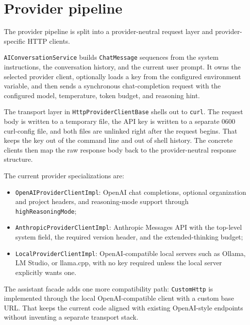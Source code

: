 \section{Provider pipeline}
\label{sec:ai-pipeline}

The provider pipeline is split into a provider-neutral request layer and provider-specific HTTP clients.

\texttt{AIConversationService} builds \texttt{ChatMessage} sequences from the system instructions, the conversation history, and the current user prompt. It owns the selected provider client, optionally loads a key from the configured environment variable, and then sends a synchronous chat-completion request with the configured model, temperature, token budget, and reasoning hint.

The transport layer in \texttt{HttpProviderClientBase} shells out to \texttt{curl}. The request body is written to a temporary file, the API key is written to a separate 0600 curl-config file, and both files are unlinked right after the request begins. That keeps the key out of the command line and out of shell history. The concrete clients then map the raw response body back to the provider-neutral response structure.

The current provider specializations are:
\begin{itemize}
\item \texttt{OpenAIProviderClientImpl}: OpenAI chat completions, optional organization and project headers, and reasoning-mode support through \texttt{highReasoningMode};
\item \texttt{AnthropicProviderClientImpl}: Anthropic Messages API with the top-level system field, the required version header, and the extended-thinking budget;
\item \texttt{LocalProviderClientImpl}: OpenAI-compatible local servers such as Ollama, LM Studio, or llama.cpp, with no key required unless the local server explicitly wants one.
\end{itemize}

The assistant facade adds one more compatibility path: \texttt{CustomHttp} is implemented through the local OpenAI-compatible client with a custom base URL. That keeps the current code aligned with existing OpenAI-style endpoints without inventing a separate transport stack.

